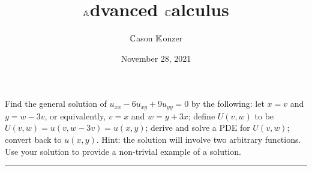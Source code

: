 \documentclass[10pt]{article}
\title{$\mathbb{A}$dvanced $\mathbb{C}$alculus}
\author{$\mathbb{C}$ason $\mathbb{K}$onzer}
\date{November 28, 2021}
\begin{document}
\maketitle

\newpage

\section{\underline{}}
\label{sec: Problem 1}

\noindent
Find the general solution of $ u_{xx} - 6u_{xy} + 9u_{yy} = 0 $ by the following: 
let $ x = v $ and $ y = w - 3v $, or equivalently, $ v = x $ and $ w = y + 3x $; 
define $ U(v,w) $ to be $ U(v,w) = u(v,w-3v) = u(x,y) $; 
derive and solve a PDE for $ U(v,w) $; 
convert back to $ u(x,y) $. 
Hint: the solution will involve two arbitrary functions. 
Use your solution to provide a non-trivial example of a solution. \\
\vspace{2.5mm}

\hrule 

\vspace{7.5mm}
\end{document}
